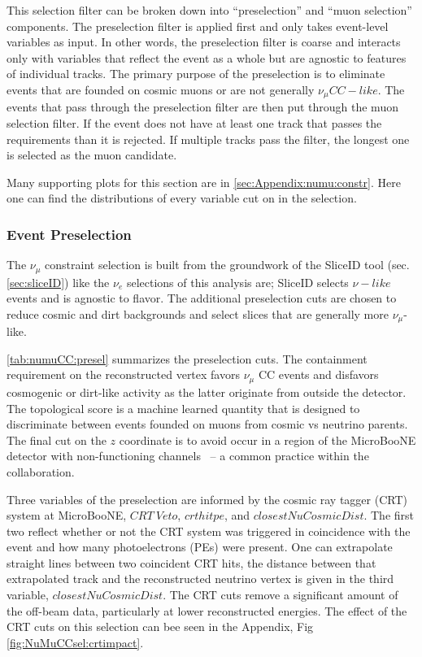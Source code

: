 \par This selection filter can be broken down into ``preselection'' and ``muon selection'' components. The preselection filter is applied first and only takes event-level variables as input. In other words, the preselection filter is coarse and interacts only with variables that reflect the event as a whole but are agnostic to features of individual tracks. The primary purpose of the preselection is to eliminate events that are founded on cosmic muons or are not generally $\nu_{\mu} CC-like$. The events that pass through the preselection filter are then put through the muon selection filter. If the event does not have at least one track that passes the requirements than it is rejected. If multiple tracks pass the filter, the longest one is selected as the muon candidate. 

\par Many supporting plots for this section are in \cref{sec:Appendix:numu:constr}. Here one can find the distributions of every variable cut on in the selection. 

\subsubsection{Event Preselection}
\label{sssec:NuMUCCsel:constr:preselec}

\par The $\nu_{\mu}$ constraint selection is built from the groundwork of the SliceID tool (sec. \ref{sec:sliceID}) like the $\nu_e$ selections of this analysis are; SliceID selects $\nu-like$ events and is agnostic to flavor. The additional preselection cuts are chosen to reduce cosmic and dirt backgrounds and select slices that are generally more $\nu_{\mu}$-like. 

\par \cref{tab:numuCC:presel} summarizes the preselection cuts. 
The containment requirement on the reconstructed vertex favors $\nu_{\mu}$ CC events and disfavors cosmogenic or dirt-like activity as the latter originate from outside the detector. The topological score is a machine learned quantity that is designed to discriminate between events founded on muons from cosmic vs neutrino parents. The final cut on the $z$ coordinate is to avoid occur in a region of the MicroBooNE detector with non-functioning channels~\cite{bib:noise} -- a common practice within the collaboration. \\

\par Three variables of the preselection are informed by the cosmic ray tagger (CRT) system at MicroBooNE, $CRT\ Veto$, $crthitpe$, and $closestNuCosmicDist$. The first two reflect whether or not the CRT system was triggered in coincidence with the event and how many photoelectrons (PEs) were present. One can extrapolate straight lines between two coincident CRT hits, the distance between that extrapolated track and the reconstructed neutrino vertex is given in the third variable, $closestNuCosmicDist$. The CRT cuts remove a significant amount of the off-beam data, particularly at lower reconstructed energies. The effect of the CRT cuts on this selection can bee seen in the Appendix, Fig \ref{fig:NuMuCCsel:crtimpact}.

